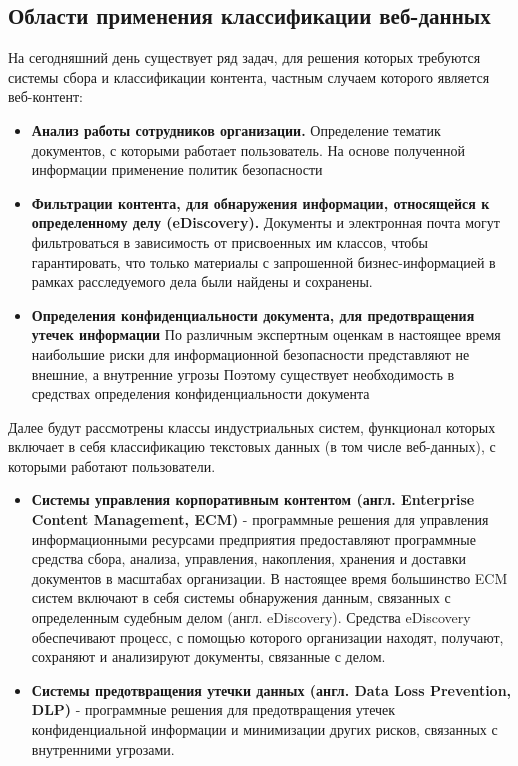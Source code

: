 \documentclass[russian, utf8, emptystyle]{eskdtext}
\begin{document}
\subsection {Области применения классификации веб-данных}
На сегодняшний день существует ряд задач, для решения которых требуются системы сбора и классификации контента, частным случаем которого является веб-контент:
\begin{itemize}
	\item {\bf Анализ работы сотрудников организации.}
	Определение тематик документов, с которыми работает пользователь. На основе полученной информации применение политик безопасности
	\item {\bf Фильтрации контента, для обнаружения информации, относящейся к определенному делу (eDiscovery).}
	Документы и электронная почта могут фильтроваться в зависимость от присвоенных им классов, чтобы гарантировать, что только материалы с запрошенной бизнес-информацией в рамках расследуемого дела были найдены и сохранены.
	\item {\bf Определения конфиденциальности документа, для предотвращения утечек информации}
	По различным экспертным оценкам в настоящее время наибольшие риски для информационной безопасности представляют не внешние, а внутренние угрозы \cite{InfoWatch}
	Поэтому существует необходимость в средствах определения конфиденциальности документа
	
\end{itemize}

Далее будут рассмотрены классы индустриальных систем, функционал которых включает в себя классификацию текстовых данных (в том числе веб-данных), с которыми работают пользователи.
\begin{itemize}
	\item {\bf 	Системы управления корпоративным контентом (англ. Enterprise Content Management, ECM) } - программные решения для управления информационными ресурсами предприятия предоставляют программные средства сбора, анализа, управления, накопления, хранения и доставки документов в масштабах организации. В настоящее время большинство ECM систем включают в себя системы обнаружения данным, связанных с определенным судебным делом (англ. eDiscovery). Средства eDiscovery обеспечивают процесс, с помощью которого организации находят, получают, сохраняют и анализируют документы, связанные с делом.
	\item {\bf Системы предотвращения утечки данных (англ. Data Loss Prevention, DLP)} -
	программные решения для предотвращения утечек конфиденциальной информации и минимизации других рисков, связанных с внутренними угрозами.
\end{itemize}
\end{document}
